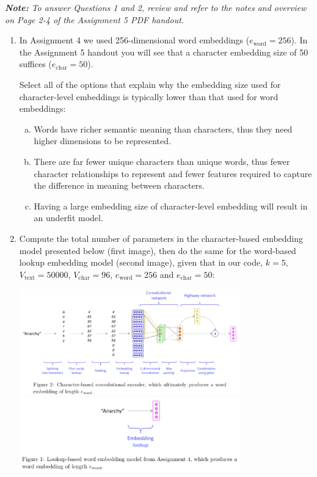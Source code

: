 {\em {\bf Note:} To answer Questions 1 and 2, review and refer to the notes and overview on Page 2-4 of the Assignment 5 PDF handout.}

\begin{enumerate}[1.]

\item {}

In Assignment 4 we used 256-dimensional word embeddings ($e_\text{word} = 256$). In the Assignment 5 handout you will see that a character embedding size of 50 suffices ($e_\text{char} = 50$).

Select all of the options that explain why the embedding size used for character-level embeddings is typically lower than that used for word embeddings:

\begin{enumerate}[(a)]
\item Words have richer semantic meaning than characters, thus they need higher dimensions to be represented.
\item There are far fewer unique characters than unique words, thus fewer character relationships to represent and fewer features required to capture the difference in meaning between characters.
\item Having a large embedding size of character-level embedding will result in an underfit model.
\end{enumerate}


\item Compute the total number of parameters in the character-based embedding model presented below (first image), then do the same for the word-based lookup embedding model (second image), given that in our code, $k = 5$, $V_\text{text}  = 50000$, $V_\text{char} = 96$, $e_\text{word} = 256$ and $e_\text{char} = 50$:

\begin{center}
\includegraphics[width=0.75\textwidth]{pre2-1.png}
\includegraphics[width=0.75\textwidth]{pre2-2.png}
\end{center}


\end{enumerate}
